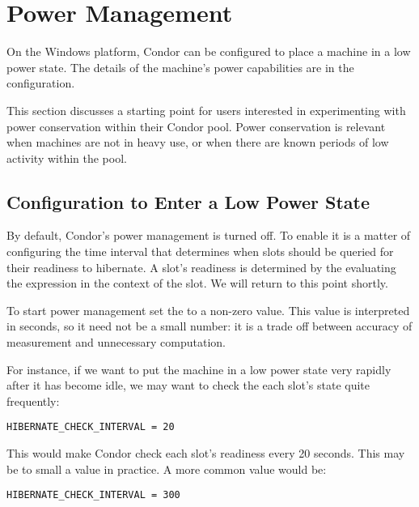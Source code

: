 \section{\label{sec:power-man}Power Management}

\MoreTodo

On the Windows platform,
Condor can be configured to place a machine in a low power state.  
The details of the machine's power capabilities are in the
configuration. 

This section discusses a starting point for users interested in 
experimenting with power conservation within their Condor pool.
Power conservation is relevant when machines are not in heavy use,
or when there are known periods of low activity within the pool.

\subsection{Configuration to Enter a Low Power State}

By default, Condor's power management is turned off.
To enable it is a matter
of configuring the time interval that determines when slots should be queried
for their readiness to hibernate.  A slot's readiness is determined by the 
evaluating the  expression in the context of the slot.  We 
will return to this point shortly.

To start power management set the  to a
non-zero value.  This value is interpreted in seconds, so it need not 
be a small number: it is a trade off between accuracy of measurement and 
unnecessary computation.  

For instance, if we want to put the machine in a low power state very rapidly
after it has become idle, we may want to check the each slot's state quite
frequently:

\begin{verbatim}
HIBERNATE_CHECK_INTERVAL = 20
\end{verbatim}

This would make Condor check each slot's readiness every 20 seconds.  This
may be to small a value in practice. A more common value would be:

\begin{verbatim}
HIBERNATE_CHECK_INTERVAL = 300
\end{verbatim}

